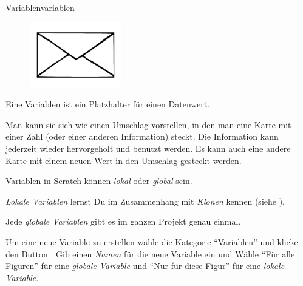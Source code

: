 \documentclass[lerntheke,12pt,a5paper,landscape]{arbeitsblatt}
\begin{document}
\begin{hilfekarte}{Variablen}{variablen}
	\begin{wrapfix}
	\begin{figure}
		\includegraphics[width=4cm]{9Diff-LT.3-Abb_Umschlag.jpg}
	\end{figure}

	Eine Variablen ist ein Platzhalter für einen Datenwert.

	Man kann sie sich wie einen Umschlag vorstellen, in den man eine Karte mit einer Zahl (oder einer anderen Information) steckt. Die Information kann jederzeit wieder hervorgeholt und benutzt werden. Es kann auch eine andere Karte mit einem neuen Wert in den Umschlag gesteckt werden.
	\end{wrapfix}

	\smallskip
	\begin{scratch}[scale=0.7]
	\end{scratch}
	\smallskip

	Variablen in Scratch können \emph{lokal} oder \emph{global} sein.
	\begin{smallitem}
		\item \emph{Lokale Variablen} lernst Du im Zusammenhang mit \emph{Klonen} kennen (siehe ).
		\item Jede \emph{globale Variablen} gibt es im ganzen Projekt genau einmal.
	\end{smallitem}

	Um eine neue Variable zu erstellen wähle die Kategorie \enquote{Variablen} und klicke den Button . Gib einen \emph{Namen} für die  neue Variable ein und Wähle \enquote{Für alle Figuren} für eine \emph{globale Variable} und \enquote{Nur für diese Figur} für eine \emph{lokale Variable}.
\end{hilfekarte}
\end{document}
